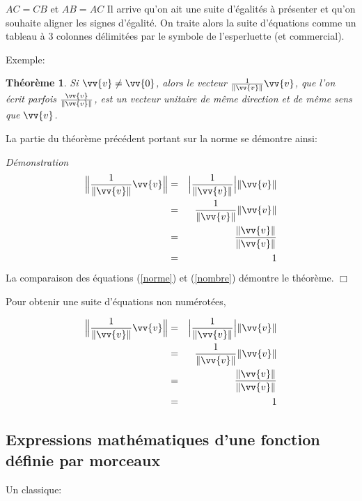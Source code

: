 \documentclass[10pt]{article}
\newtheorem{theorem}{Théorème}
\newenvironment{proof}
{\par\noindent
\textit{Démonstration}\ }
{
\hfill{$\Box$}
}
\begin{document}
\(AC=CB\) et \(AB=AC\) Il arrive qu'on ait une suite d'égalités à
présenter et qu'on souhaite aligner les signes d'égalité. On traite
alors la suite d'équations comme un tableau à 3 colonnes délimitées par
le symbole de l'esperluette (et commercial).

Exemple:

\begin{theorem} Si $\vv{v} \neq \vv{0}$, alors le vecteur $\frac{1}{\| \vv{v}\|}\vv{v}$, que l'on écrit parfois $\frac{\vv{v}}{\| \vv{v}\|}$, est un vecteur unitaire de même direction et de même sens que $\vv{v}$.
\end{theorem}

La partie du théorème précédent portant sur la norme se démontre ainsi:

\begin{proof}
\begin{eqnarray}
\Big\|{\frac{1}{\| \vv{v}\|}\vv{v}} \Big\|&=& \Big |\frac{1}{\| \vv{v}\|} \Big |\| \vv{v}\|\label{norme}\\
&=&\frac{1}{\| \vv{v}\|}\| \vv{v}\|  \nonumber\\
&=&\frac{\| \vv{v}\|}{\| \vv{v}\|} \nonumber\\
&=&1 \label{nombre}
\end{eqnarray}
La comparaison des équations (\ref{norme}) et (\ref{nombre}) démontre le théorème.\end{proof}

Pour obtenir une suite d'équations non numérotées,

\begin{eqnarray*}
\Big\|{\frac{1}{\| \vv{v}\|}\vv{v}} \Big\|&=& \Big |\frac{1}{\| \vv{v}\|} \Big |\| \vv{v}\| \\
&=&\frac{1}{\| \vv{v}\|}\| \vv{v}\| \\
&=&\frac{\| \vv{v}\|}{\| \vv{v}\|} \\
&=&1
\end{eqnarray*}

\hypertarget{expressions-mathematiques-dune-fonction-definie-par-morceaux}{%
\subsection{\texorpdfstring{Expressions mathématiques d'une fonction
définie par morceaux
\label{morceaux}}{Expressions mathématiques d'une fonction définie par morceaux }}\label{expressions-mathematiques-dune-fonction-definie-par-morceaux}}

Un classique:
\end{document}
